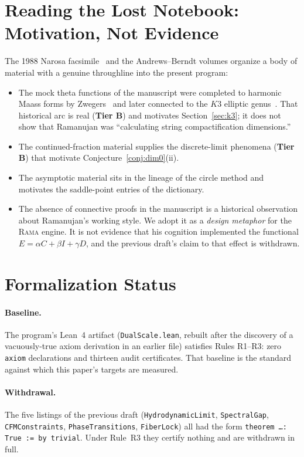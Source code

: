 \documentclass[11pt,a4paper]{article}
\theoremstyle{plain}
\theoremstyle{definition}
\theoremstyle{remark}
\newcommand{\tierB}{\textbf{Tier B}}
\begin{document}
\section{Reading the Lost Notebook: Motivation, Not Evidence}
\label{sec:lostnotebook}

The 1988 Narosa facsimile~\cite{Narosa1988} and the Andrews--Berndt volumes
\cite{AndrewsBerndt} organize a body of material with a genuine throughline
into the present program:

\begin{itemize}
\item The mock theta functions of the manuscript were completed to harmonic
Maass forms by Zwegers~\cite{Zwegers2002} and later connected to the $K3$
elliptic genus~\cite{EOT2011,Gannon2016}. That historical arc is real
(\tierB{}) and motivates Section~\ref{sec:k3}; it does not show that
Ramanujan was ``calculating string compactification dimensions.''
\item The continued-fraction material supplies the discrete-limit phenomena
(\tierB{}) that motivate Conjecture~\ref{conj:dim0}(ii).
\item The asymptotic material sits in the lineage of the circle method and
motivates the saddle-point entries of the dictionary.
\item The absence of connective proofs in the manuscript is a historical
observation about Ramanujan's working style. We adopt it as a \emph{design
metaphor} for the \textsc{Rama} engine. It is not evidence that his
cognition implemented the functional $E=\alpha C+\beta I+\gamma D$, and the
previous draft's claim to that effect is withdrawn.
\end{itemize}

\section{Formalization Status}\label{sec:lean}

\paragraph{Baseline.} The program's Lean~4 artifact
(\texttt{DualScale.lean}, rebuilt after the discovery of a vacuously-true
axiom derivation in an earlier file) satisfies Rules R1--R3: zero
\texttt{axiom} declarations and thirteen audit certificates. That baseline
is the standard against which this paper's targets are measured.

\paragraph{Withdrawal.} The five listings of the previous draft
(\texttt{HydrodynamicLimit}, \texttt{SpectralGap}, \texttt{CFMConstraints},
\texttt{PhaseTransitions}, \texttt{FiberLock}) all had the form
\texttt{theorem \ldots : True := by trivial}. Under Rule~R3 they certify
nothing and are withdrawn in full.
\end{document}
